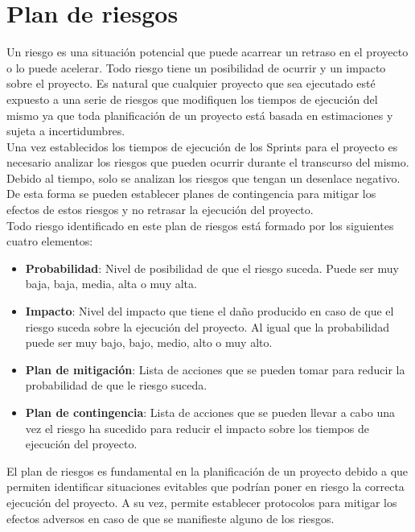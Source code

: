 \section{Plan de riesgos}
Un riesgo \cite{hughes2009software} es una situación potencial que puede acarrear un retraso en el proyecto o lo puede acelerar. Todo riesgo tiene un posibilidad de ocurrir y un impacto sobre el proyecto. Es natural que cualquier proyecto que sea ejecutado esté expuesto a una serie de riesgos que modifiquen los tiempos de ejecución del mismo ya que toda planificación de un proyecto está basada en estimaciones y sujeta a incertidumbres.
\\

Una vez establecidos los tiempos de ejecución de los Sprints para el proyecto es necesario analizar los riesgos que pueden ocurrir durante el transcurso del mismo. Debido al tiempo, solo se analizan los riesgos que tengan un desenlace negativo. De esta forma se pueden establecer planes de contingencia para mitigar los efectos de estos riesgos y no retrasar la ejecución del proyecto.
\\

Todo riesgo identificado en este plan de riesgos está formado por los siguientes cuatro elementos:
\begin{itemize}
	\item \textbf{Probabilidad}: Nivel de posibilidad de que el riesgo suceda. Puede ser muy baja, baja, media, alta o muy alta.
	\item \textbf{Impacto}: Nivel del impacto que tiene el daño producido en caso de que el riesgo suceda sobre la ejecución del proyecto. Al igual que la probabilidad puede ser muy bajo, bajo, medio, alto o muy alto.
	\item \textbf{Plan de mitigación}: Lista de acciones que se pueden tomar para reducir la probabilidad de que le riesgo suceda.
	\item \textbf{Plan de contingencia}: Lista de acciones que se pueden llevar a cabo una vez el riesgo ha sucedido para reducir el impacto sobre los tiempos de ejecución del proyecto.
\end{itemize}

El plan de riesgos es fundamental en la planificación de un proyecto debido a que permiten identificar situaciones evitables que podrían poner en riesgo la correcta ejecución del proyecto. A su vez, permite establecer protocolos para mitigar los efectos adversos en caso de que se manifieste alguno de los riesgos.
\\

